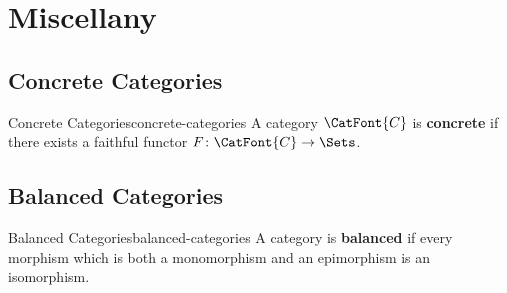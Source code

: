 \section{Miscellany}\label{section-miscellany}
\subsection{Concrete Categories}\label{subsection-concrete-categories}
\begin{definition}{Concrete Categories}{concrete-categories}%
    A category $\CatFont{C}$ is \textbf{concrete} if there exists a faithful functor $F\colon\CatFont{C}\to\Sets$.
\end{definition}
\subsection{Balanced Categories}\label{subsection-balanced-categories}
\begin{definition}{Balanced Categories}{balanced-categories}%
    A category is \textbf{balanced} if every morphism which is both a monomorphism and an epimorphism is an isomorphism.
\end{definition}
